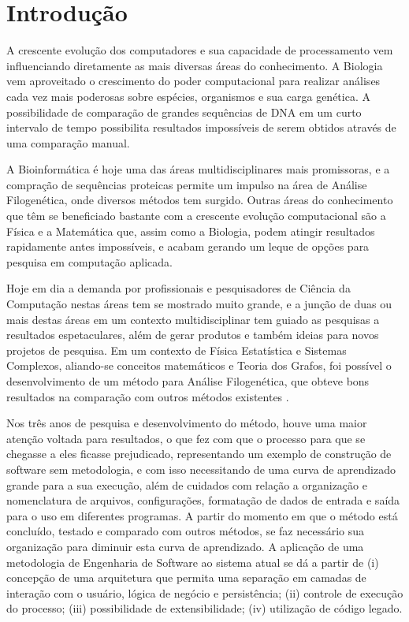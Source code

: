 \chapter{Introdução}

A crescente evolução dos computadores e sua capacidade de processamento vem influenciando diretamente as mais diversas áreas do conhecimento. A Biologia
vem aproveitado o crescimento do poder computacional para realizar análises cada vez mais poderosas sobre espécies, organismos e sua carga genética.
A possibilidade de comparação de grandes sequências de DNA em um curto intervalo de tempo possibilita resultados impossíveis de serem obtidos através
de uma comparação manual.

A Bioinformática é hoje uma das áreas multidisciplinares mais promissoras, e a compração de sequências proteicas permite um impulso na área de Análise
Filogenética, onde diversos métodos tem surgido. Outras áreas do conhecimento que têm se beneficiado bastante com a crescente evolução computacional são a
Física e a Matemática que, assim como a Biologia, podem atingir resultados rapidamente antes impossíveis, e acabam gerando um leque de opções para pesquisa
em computação aplicada.

Hoje em dia a demanda por profissionais e pesquisadores de Ciência da Computação nestas áreas tem se mostrado muito grande, e a junção de duas ou mais destas
áreas em um contexto multidisciplinar tem guiado as pesquisas a resultados espetaculares, além de gerar produtos e também ideias para novos projetos de
pesquisa. Em um contexto de Física Estatística e Sistemas Complexos, aliando-se conceitos matemáticos e Teoria dos Grafos, foi possível o
desenvolvimento de um método para Análise Filogenética, que obteve bons resultados na comparação com outros métodos existentes \cite{andrade2011}.

Nos três anos de pesquisa e desenvolvimento do método, houve uma maior atenção voltada para resultados, o que fez com que o processo para que se chegasse
a eles ficasse prejudicado, representando um exemplo de construção de software sem metodologia, e com isso necessitando de uma curva de aprendizado grande
para a sua execução, além de cuidados com relação a organização e nomenclatura de arquivos, configurações, formatação de dados de entrada e saída para o
uso em diferentes programas. A partir do momento em que o método está concluído, testado e comparado com outros métodos, se faz necessário sua organização
para diminuir esta curva de aprendizado. A aplicação de uma metodologia de Engenharia de Software ao sistema atual se dá a partir de (i) concepção de uma
arquitetura que permita uma separação em camadas de interação com o usuário, lógica de negócio e persistência; (ii) controle de execução do processo;
(iii) possibilidade de extensibilidade; (iv) utilização de código legado.

